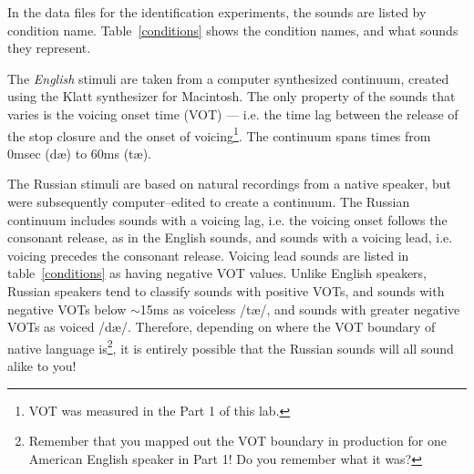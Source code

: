 \documentclass{article}
\begin{document}
In the data files for the identification experiments, the sounds are listed by condition name. Table~\ref{conditions} shows the condition names, and what sounds they represent.

The \emph{English} stimuli are taken from a computer synthesized continuum, created using the Klatt synthesizer for Macintosh. The only property of the sounds that varies is the voicing onset time (VOT) --- i.e. the time lag between the release of the stop closure and the onset of voicing\footnote{VOT was measured in the Part 1 of this lab.}. The continuum spans times from 0msec (d\ae{}) to 60ms (t\ae{}).

The Russian stimuli are based on natural recordings from a native speaker, but were subsequently computer--edited to create a continuum. The Russian continuum includes sounds with a voicing lag, i.e. the voicing onset follows the consonant release, as in the English sounds, and sounds with a voicing lead, i.e. voicing precedes the consonant release. Voicing lead sounds are listed in table~\ref{conditions} as having negative VOT values. Unlike English speakers, Russian speakers tend to classify sounds with positive VOTs, and sounds with negative VOTs below $\sim$15ms as voiceless /t\ae{}/, and sounds with greater negative VOTs as voiced /d\ae{}/. Therefore, depending on where the VOT boundary of native language is\footnote{Remember that you mapped out the VOT boundary in production for one American English speaker in Part 1! Do you remember what it was?}, it is entirely possible that the Russian sounds will all sound alike to you!
\end{document}
